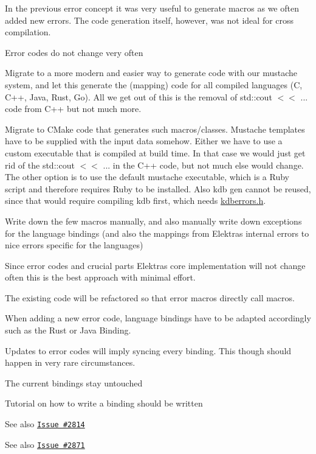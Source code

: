 In the previous error concept it was very useful to generate macros as we often added new errors. The code generation itself, however, was not ideal for cross compilation.


\begin{DoxyItemize}
\item Error codes do not change very often
\end{DoxyItemize}


\begin{DoxyItemize}
\item Migrate to a more modern and easier way to generate code with our mustache system, and let this generate the (mapping) code for all compiled languages (C, C++, Java, Rust, Go). All we get out of this is the removal of {\ttfamily std\+::cout $<$$<$ ...} code from C++ but not much more.
\item Migrate to C\+Make code that generates such macros/classes. Mustache templates have to be supplied with the input data somehow. Either we have to use a custom executable that is compiled at build time. In that case we would just get rid of the {\ttfamily std\+::cout $<$$<$ ...} in the C++ code, but not much else would change. The other option is to use the default mustache executable, which is a Ruby script and therefore requires Ruby to be installed. Also kdb gen cannot be reused, since that would require compiling kdb first, which needs \hyperlink{kdberrors_8h}{kdberrors.\+h}.
\end{DoxyItemize}

Write down the few macros manually, and also manually write down exceptions for the language bindings (and also the mappings from Elektra\textquotesingle{}s internal errors to nice errors specific for the languages)

Since error codes and crucial parts Elektra\textquotesingle{}s core implementation will not change often this is the best approach with minimal effort.

The existing code will be refactored so that error macros directly call macros.

When adding a new error code, language bindings have to be adapted accordingly such as the Rust or Java Binding.


\begin{DoxyItemize}
\item Updates to error codes will imply syncing every binding. This though should happen in very rare circumstances.
\end{DoxyItemize}


\begin{DoxyItemize}
\item The current bindings stay untouched
\item Tutorial on how to write a binding should be written
\end{DoxyItemize}


\begin{DoxyItemize}
\item See also \href{https://issues.libelektra.org/2814}{\tt Issue \#2814}
\item See also \href{https://issues.libelektra.org/2871}{\tt Issue \#2871} 
\end{DoxyItemize}
